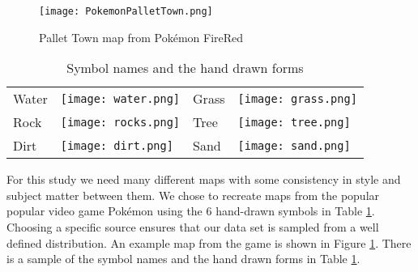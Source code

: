 \begin{figure}[h]
\begin{center}
\texttt{[image: PokemonPalletTown.png]}
\end{center}
\caption{Pallet Town map from Pok\'{e}mon FireRed \cite{firered}}
\label{fig:pokemon}
\end{figure}

\begin{table}
\label{table:symbols}
\caption{Symbol names and the hand drawn forms}
\begin{center}
\begin{tabular}{llll}
Water & \texttt{[image: water.png]} &
Grass & \texttt{[image: grass.png]} \\
Rock & \texttt{[image: rocks.png]} &
Tree & \texttt{[image: tree.png]} \\
Dirt & \texttt{[image: dirt.png]} &
Sand & \texttt{[image: sand.png]} \\
\end{tabular}
\end{center}
\end{table}


For this study we need many different maps with some consistency in style and
subject matter between them. We chose to recreate maps from the popular popular
video game Pok\'{e}mon using the 6 hand-drawn symbols in Table
\ref{table:symbols}.  Choosing a specific source ensures that our data set is
sampled from a well defined distribution.  An example map from the game is
shown in Figure \ref{fig:pokemon}. There is a sample of the symbol names and
the hand drawn forms in Table \ref{table:symbols}.


